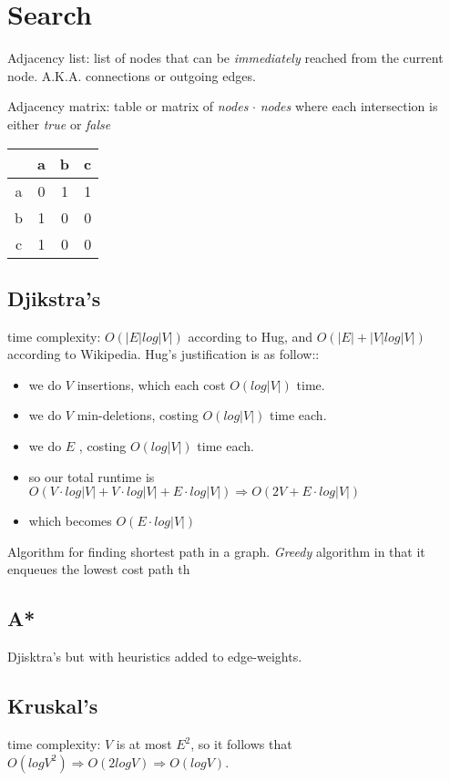 \documentclass[12pt, letterpaper]{article}
\begin{document}
\section{Search}
Adjacency list: list of nodes that can be \emph{immediately} reached from the current node. A.K.A. connections or outgoing edges.

Adjacency matrix: table or matrix of \emph{nodes} $\cdot$ \emph{nodes} where each intersection is either \emph{true} or \emph{false}

\begin{center}
\begin{tabular}{c | c c c}
 & a & b & c \\ \hline
 a & 0 & 1 & 1 \\
 b & 1 & 0 & 0 \\
 c & 1 & 0 & 0 \\
\end{tabular}
\end{center}

\subsection{Djikstra's}
time complexity: $O(|E|log|V|)$ according to Hug, and $O(|E| + |V|log|V|)$ according to Wikipedia. Hug's justification is as follow::
\begin{itemize}
\item we do $V$ insertions, which each cost $O(log|V|)$ time.
\item we do $V$ min-deletions, costing $O(log|V|)$ time each.
\item we do $E$ , costing $O(log|V|)$ time each.
\item so our total runtime is $O(V\cdot log|V| + V\cdot log|V| + E\cdot log|V|) \Rightarrow O(2V+E\cdot log|V|)$
\item which becomes $O(E\cdot log|V|)$
\end{itemize}

Algorithm for finding shortest path in a graph. \textit{Greedy} algorithm in that it enqueues the lowest cost path th
\subsection{A*}
Djisktra's but with heuristics added to edge-weights.
\subsection{Kruskal's}
time complexity: $V$ is at most $E^2$, so it follows that 
$O(logV^2) \Rightarrow O(2logV) \Rightarrow O(logV)$.
\end{document}

